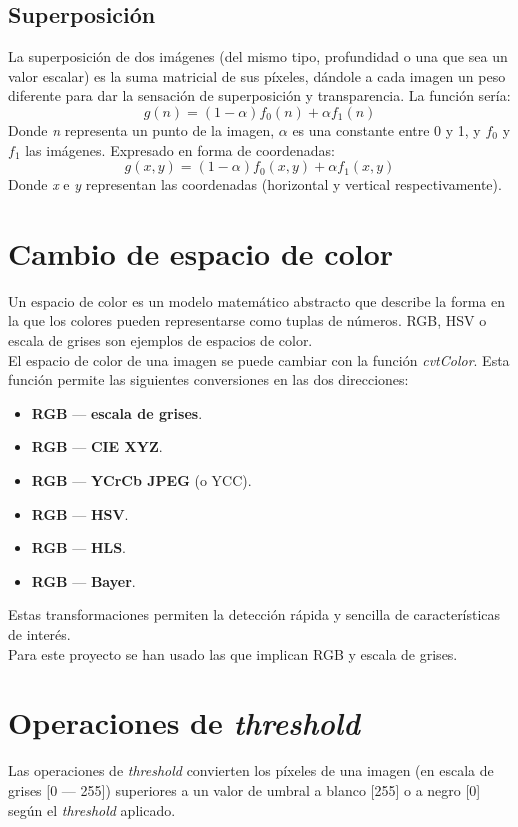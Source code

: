 \subsection{Superposición}
La superposición de dos imágenes (del mismo tipo, profundidad o una
que sea un valor escalar) es la suma matricial de sus píxeles,
dándole a cada imagen un peso diferente para dar la sensación
de superposición y transparencia. La función sería:
\begin{equation*}
g(n) = (1 - \alpha)f_0(n) + \alpha f_1(n)
\end{equation*}
Donde \emph{n} representa un punto de la imagen, \emph{$\alpha$} es 
una constante entre 0 y 1, y \emph{$f_0$} y \emph{$f_1$} las imágenes.
Expresado en forma de coordenadas:
\begin{equation*}
g(x, y) = (1 - \alpha)f_0(x, y) + \alpha f_1(x, y)
\end{equation*}
Donde \emph{x} e \emph{y} representan las coordenadas (horizontal y
vertical respectivamente).


\section{Cambio de espacio de color}
Un espacio de color es un modelo matemático abstracto que describe 
la forma en la que los colores pueden representarse como tuplas de 
números. RGB, HSV o escala de grises son ejemplos de espacios de color. \\
El espacio de color de una imagen se puede cambiar con la función \emph{cvtColor}.
Esta función permite las siguientes conversiones en las dos direcciones:
\begin{itemize}
\item  \textbf{RGB} --- \textbf{escala de grises}.
\item  \textbf{RGB} --- \textbf{CIE XYZ}.
\item  \textbf{RGB} --- \textbf{YCrCb JPEG} (o YCC).
\item  \textbf{RGB} --- \textbf{HSV}.
\item  \textbf{RGB} --- \textbf{HLS}.
\item  \textbf{RGB} --- \textbf{Bayer}.
\end{itemize}
Estas transformaciones permiten la detección rápida y sencilla de características
de interés. \\
Para este proyecto se han usado las que implican RGB y escala de grises.

\section{Operaciones de \emph{threshold}}
Las operaciones de \emph{threshold} convierten los píxeles de una
imagen (en escala de grises [0 --- 255]) superiores a un valor de
umbral a blanco [255] o a negro [0] según el \emph{threshold} aplicado.
